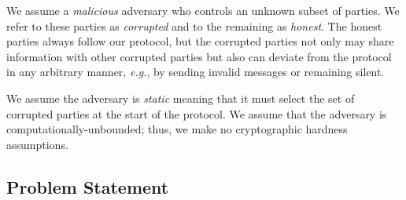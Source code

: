 \documentclass[11pt,letter]{article}
\newcommand{\eg}{\emph{e.g.}}
\theoremstyle{mytheoremstyle}
\begin{document}
We assume a \emph{malicious} adversary who controls an unknown subset of parties. We refer to these parties as \emph{corrupted} and to the remaining as \emph{honest}. The honest parties always follow our protocol, but the corrupted parties not only may share information with other corrupted parties but also can deviate from the protocol in any arbitrary manner, \eg, by sending invalid messages or remaining silent. 

We assume the adversary is \emph{static} meaning that it must select the set of corrupted parties at the start of the protocol. We assume that the adversary is computationally-unbounded; thus, we make no cryptographic hardness assumptions.

\subsection{Problem Statement} \label{sec:problem}
\end{document}
